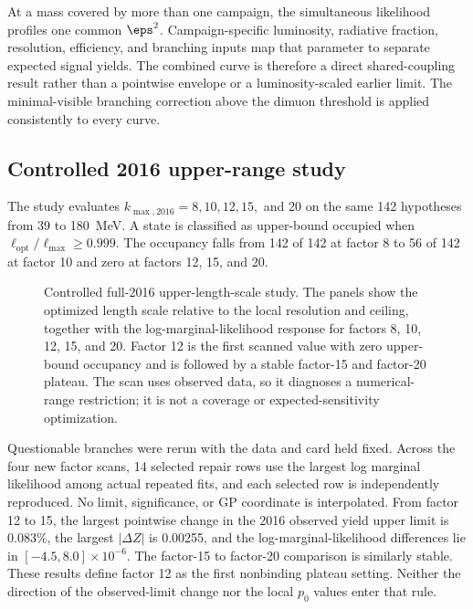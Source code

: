 At a mass covered by more than one campaign, the simultaneous likelihood profiles
one common $\eps^2$. Campaign-specific luminosity, radiative fraction, resolution,
efficiency, and branching inputs map that parameter to separate expected signal
yields. The combined curve is therefore a direct shared-coupling result rather
than a pointwise envelope or a luminosity-scaled earlier limit. The
minimal-visible branching correction above the dimuon threshold is applied
consistently to every curve.

\subsection{Controlled 2016 upper-range study}
\label{sec:results-v4p1-lsupper-study}
\label{sec:results-v4-support-audit}

The study evaluates $k_{\max,2016}=8,10,12,15,$ and 20 on the same 142 hypotheses
from 39 to 180~MeV. A state is classified as upper-bound occupied when
$\ell_{\mathrm{opt}}/\ell_{\max}\geq0.999$. The occupancy falls from 142 of 142 at
factor 8 to 56 of 142 at factor 10 and zero at factors 12, 15, and 20.

\begin{figure}[H]
\centering
{}
\caption{Controlled full-2016 upper-length-scale study. The panels show the
optimized length scale relative to the local resolution and ceiling, together with
the log-marginal-likelihood response for factors 8, 10, 12, 15, and 20. Factor 12
is the first scanned value with zero upper-bound occupancy and is followed by a
stable factor-15 and factor-20 plateau. The scan uses observed data, so it
diagnoses a numerical-range restriction; it is not a coverage or
expected-sensitivity optimization.}
\label{fig:results-v4p1-lsupper-study}
\end{figure}

Questionable branches were rerun with the data and card held fixed. Across the four
new factor scans, 14 selected repair rows use the largest log marginal likelihood
among actual repeated fits, and each selected row is independently reproduced. No
limit, significance, or GP coordinate is interpolated. From factor 12 to 15, the
largest pointwise change in the 2016 observed yield upper limit is 0.083\%, the
largest $|\Delta Z|$ is 0.00255, and the log-marginal-likelihood differences lie in
$[-4.5,8.0]\times10^{-6}$. The factor-15 to factor-20 comparison is similarly
stable. These results define factor 12 as the first nonbinding plateau setting.
Neither the direction of the observed-limit change nor the local $p_0$ values
enter that rule.

